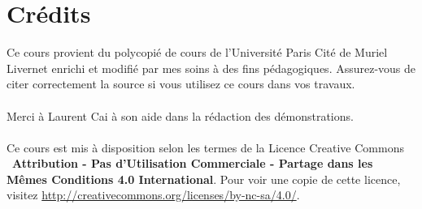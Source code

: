 \documentclass{article}
\begin{document}



%


\newpage
\tableofcontents 
\section*{Crédits}
Ce cours provient du polycopié de cours de l'Université Paris Cité de Muriel Livernet enrichi et modifié par mes soins à des fins pédagogiques. Assurez-vous de citer correctement la source si vous utilisez ce cours dans vos travaux.\\\\
Merci à Laurent Cai à son aide dans la rédaction des démonstrations.\\\\
Ce cours est mis à disposition selon les termes de la Licence Creative Commons \ccbyncsa\ \textbf{Attribution - Pas d'Utilisation Commerciale - Partage dans les Mêmes Conditions 4.0 International}. 
Pour voir une copie de cette licence, visitez \url{http://creativecommons.org/licenses/by-nc-sa/4.0/}.
\end{document}
